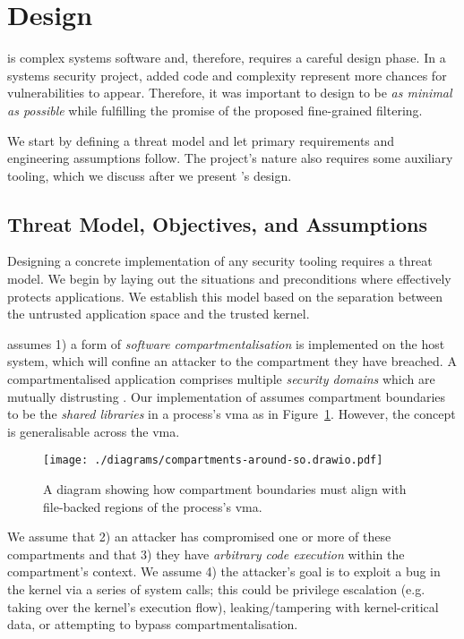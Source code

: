 \section{Design} \label{sec:design}

\af is complex systems software and, therefore, requires a careful
design phase. In a systems security project, added code and complexity
represent more chances for vulnerabilities to appear. Therefore, it was
important to design \af to be \textit{as minimal as possible} while
fulfilling the promise of the proposed fine-grained filtering.

We start by defining a threat model and let primary requirements and
engineering assumptions follow. The project's nature also requires some auxiliary
tooling, which we discuss after we present \af's design. 

\subsection{Threat Model, Objectives, and Assumptions}\label{subsec:objs-assumpions-tm}


Designing a concrete implementation of any security tooling requires a threat
model. We begin by laying out the situations and preconditions where \af effectively
protects applications. We establish this model based on the separation
between the untrusted application space and the trusted kernel. 

\af assumes 1) a form of \textit{software compartmentalisation} is implemented
on the host system, which will confine an attacker to the compartment 
they have breached. A compartmentalised application comprises multiple \textit
{security domains} which are mutually distrusting \cite{SOK}. Our
implementation of \af assumes compartment boundaries to be the \textit{shared
libraries} in a process's \ac{vma} as in Figure~\ref{fig:compartments-around-vma}. However, the concept is generalisable across the \ac{vma}.

\begin{figure}[ht]
    \centering
    \texttt{[image: ./diagrams/compartments-around-so.drawio.pdf]} 
    \caption{A diagram showing how compartment boundaries must align
    with file-backed regions of the process's \ac{vma}.}
    \label{fig:compartments-around-vma}
\end{figure}

We assume that 2) an attacker has compromised one or more of these compartments and that
3) they have \textit{arbitrary code execution} within the compartment's context. We
assume 4) the attacker's goal is to exploit a bug in the kernel via a series of
system calls; this could be privilege escalation (e.g. taking over the kernel's
execution flow), leaking/tampering with kernel-critical data, or attempting to
bypass compartmentalisation. 

